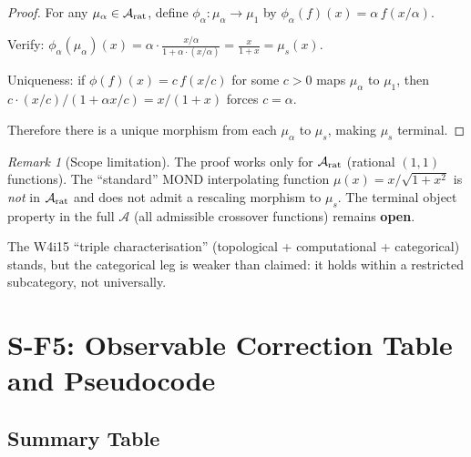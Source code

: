 \documentclass[11pt]{article}
\theoremstyle{definition}
\theoremstyle{remark}
\newtheorem{remark}[theorem]{Remark}
\begin{document}
\begin{proof}
For any $\mu_\alpha \in \mathcal{A}_{\rm rat}$, define $\phi_\alpha:
\mu_\alpha \to \mu_1$ by $\phi_\alpha(f)(x) = \alpha\,f(x/\alpha)$.

Verify: $\phi_\alpha(\mu_\alpha)(x) = \alpha \cdot
\frac{x/\alpha}{1 + \alpha\cdot(x/\alpha)} = \frac{x}{1+x} = \mu_s(x)$.

Uniqueness: if $\phi(f)(x) = c\,f(x/c)$ for some $c > 0$ maps
$\mu_\alpha$ to $\mu_1$, then $c \cdot (x/c)/(1+\alpha x/c)
= x/(1+x)$ forces $c = \alpha$.

Therefore there is a unique morphism from each $\mu_\alpha$ to $\mu_s$,
making $\mu_s$ terminal.
\end{proof}

\begin{remark}[Scope limitation]
The proof works only for $\mathcal{A}_{\rm rat}$ (rational $(1,1)$
functions). The ``standard'' MOND interpolating function
$\mu(x) = x/\sqrt{1+x^2}$ is \emph{not} in $\mathcal{A}_{\rm rat}$
and does not admit a rescaling morphism to $\mu_s$. The terminal
object property in the full $\mathcal{A}$ (all admissible crossover
functions) remains \textbf{open}.

The W4i15 ``triple characterisation'' (topological + computational +
categorical) stands, but the categorical leg is weaker than claimed:
it holds within a restricted subcategory, not universally.
\end{remark}

\section{S-F5: Observable Correction Table and Pseudocode}
\label{sec:observables}

\subsection{Summary Table}
\end{document}
